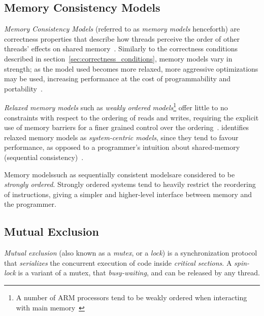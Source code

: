 \subsection{Memory Consistency Models}
\emph{Memory Consistency Models} (referred to as \emph{memory models} henceforth) are correctness properties that describe how
threads perceive the order of other threads' effects on shared
memory~\citep[Section~3.7]{herlihy2020art}. Similarly to the correctness
conditions described in section~\ref{sec:correctness_conditions}, memory
models vary in strength; as the model used becomes more relaxed, more aggressive
optimizations may be used, increasing performance at the cost of
programmability and portability~\citep{gharachorloo1996consistency}.

\emph{Relaxed memory models} such as \emph{weakly ordered models}\footnote{A number of ARM processors tend to be weakly ordered when interacting with main memory~\citep[Section~A3.5.5]{arm2022architecture}} offer little to no
constraints with respect to the ordering of reads and writes, requiring the
explicit use of memory barriers for a finer grained control over the ordering~\citep{gharachorloo1996consistency}. \citeauthor{gharachorloo1996consistency} identifies relaxed
memory models as \emph{system-centric models}, since they tend to favour
performance, as opposed to a programmer's intuition about shared-memory
(sequential consistency)~\citep{gharachorloo1996consistency}.

Memory models\textemdash such as sequentially consistent models\textemdash are considered to be
\emph{stron\-gly ordered}. Strongly ordered systems tend to
heavily restrict the reordering of instructions, giving a simpler and
higher-level interface between memory and the programmer. 

\subsection{Mutual Exclusion}
\emph{Mutual exclusion} (also known as a \emph{mutex}, or a \emph{lock}) is a
synchronization protocol that \emph{serializes} the concurrent execution of
code inside \emph{critical sections}. A \emph{spin-lock} is a variant of a
mutex, that \emph{busy-waiting}, and can be released by any thread.

